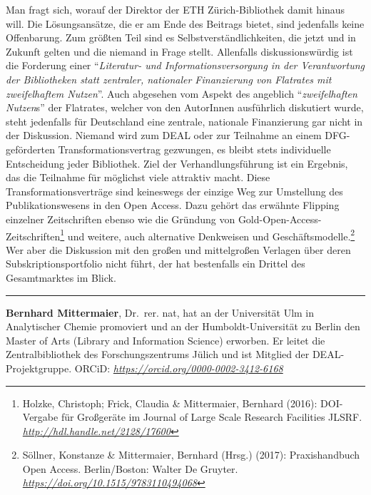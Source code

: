 \documentclass[a4paper,
fontsize=11pt,
oneside,
numbers=noperiodatend,
parskip=half-,
bibliography=totoc,
final
]{scrartcl}
\begin{document}
Man fragt sich, worauf der Direktor der ETH Zürich-Bibliothek damit
hinaus will. Die Lösungsansätze, die er am Ende des Beitrags bietet,
sind jedenfalls keine Offenbarung. Zum größten Teil sind es
Selbstverständlichkeiten, die jetzt und in Zukunft gelten und die
niemand in Frage stellt. Allenfalls diskussionswürdig ist die Forderung
einer \enquote{\emph{Literatur- und Informationsversorgung in der
Verantwortung der Bibliotheken statt zentraler, nationaler Finanzierung
von Flatrates mit zweifelhaftem Nutzen}}. Auch abgesehen vom Aspekt des
angeblich \enquote{\emph{zweifelhaften Nutzen}s} der Flatrates, welcher
von den AutorInnen ausführlich diskutiert wurde, steht jedenfalls für
Deutschland eine zentrale, nationale Finanzierung gar nicht in der
Diskussion. Niemand wird zum DEAL oder zur Teilnahme an einem
DFG-geförderten Transformationsvertrag gezwungen, es bleibt stets
individuelle Entscheidung jeder Bibliothek. Ziel der Verhandlungsführung
ist ein Ergebnis, das die Teilnahme für möglichst viele attraktiv macht.
Diese Transformationsverträge sind keineswegs der einzige Weg zur
Umstellung des Publikationswesens in den Open Access. Dazu gehört das
erwähnte Flipping einzelner Zeitschriften ebenso wie die Gründung von
Gold-Open-Access-Zeitschriften\footnote{Holzke, Christoph; Frick,
  Claudia \& Mittermaier, Bernhard (2016): DOI-Vergabe für Großgeräte im
  Journal of Large Scale Research Facilities JLSRF.
  \href{http://hdl.handle.net/2128/17600}{\emph{http://hdl.handle.net/2128/17600}}}
und weitere, auch alternative Denkweisen und Geschäftsmodelle.\footnote{Söllner,
  Konstanze \& Mittermaier, Bernhard (Hrsg.) (2017): Praxishandbuch Open
  Access. Berlin/Boston: Walter De Gruyter.
  \href{https://doi.org/10.1515/9783110494068}{\emph{https://doi.org/10.1515/9783110494068}}}
Wer aber die Diskussion mit den großen und mittelgroßen Verlagen über
deren Subskriptionsportfolio nicht führt, der hat bestenfalls ein
Drittel des Gesamtmarktes im Blick.

\begin{center}\rule{0.5\linewidth}{\linethickness}\end{center}

\textbf{Bernhard Mittermaier}, Dr.~rer. nat, hat an der Universität Ulm
in Analytischer Chemie promoviert und an der Humboldt-Universität zu
Berlin den Master of Arts (Library and Information Science) erworben. Er
leitet die Zentralbibliothek des Forschungszentrums Jülich und ist
Mitglied der DEAL-Projektgruppe. ORCiD:
\href{https://orcid.org/0000-0002-3412-6168}{\emph{https://orcid.org/0000-0002-3412-6168}}
\end{document}
